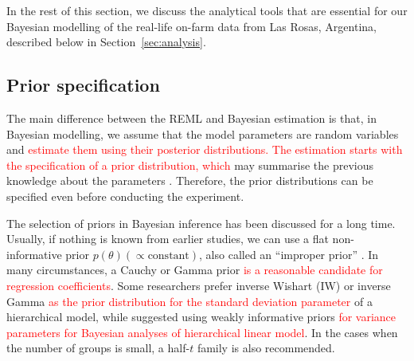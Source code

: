 \documentclass[a4paper]{article}   	%
\begin{document}
	In the rest of this section, we discuss the analytical tools that are essential for our Bayesian modelling of the real-life on-farm data from Las Rosas, Argentina, described below in Section~\ref{sec:analysis}.
	
	\subsection{Prior specification}
	
	The main difference between the REML and Bayesian estimation is that, in Bayesian modelling, we assume that the model parameters are random variables and \textcolor{red}{estimate them using their posterior distributions. The estimation starts with the specification of a prior distribution, which} may summarise the previous knowledge about the parameters \parencite{Onofri2019Analysing}. Therefore, the prior distributions can be specified even before conducting the experiment. 
	
	The selection of priors in Bayesian inference has been discussed for a long time. Usually, if nothing is known from earlier studies, we can use a flat non-informative prior $p(\theta) (\propto \mbox{constant})$, also called an ``improper prior'' \parencite{gelman2006Prior}. In many circumstances, a Cauchy or Gamma prior \textcolor{red}{is a reasonable candidate for regression coefficients}. Some researchers prefer inverse Wishart (IW) or inverse Gamma \textcolor{red}{as the prior distribution for the standard deviation parameter} of a hierarchical model, while \textcite{gelman2006Prior,gelman2017Prior} suggested using weakly informative priors \textcolor{red}{for variance parameters for Bayesian analyses of hierarchical linear model}. In the cases when the number of groups is small, a half-$t$ family is also recommended.
	
\end{document}
